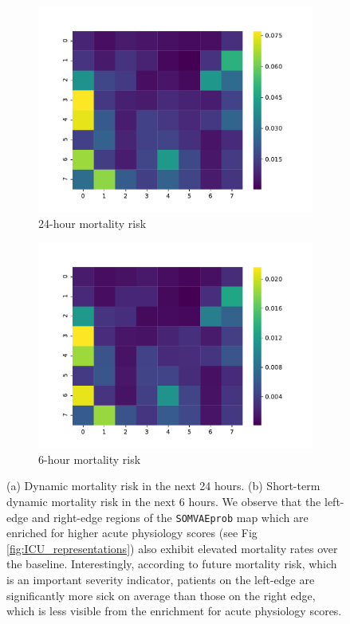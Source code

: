 \begin{figure}[h!]
\centering
\begin{subfigure}[t]{0.47\textwidth}
\centering
\includegraphics[scale=0.4]{./figures/icu_somvaeprob/detail_heatmaps_unit_discharge_expired_24}
\caption{24-hour mortality risk}
\end{subfigure}
\begin{subfigure}[t]{0.47\textwidth}
\centering
\includegraphics[scale=0.4]{./figures/icu_somvaeprob/detail_heatmaps_unit_discharge_expired_6}
\caption{6-hour mortality risk}
\end{subfigure}
\caption{(a) Dynamic mortality risk in the next 24 hours. (b) Short-term dynamic mortality risk in the next
             6 hours. We observe that the left-edge and right-edge regions of the \texttt{SOMVAEprob} map which
             are enriched for higher acute physiology scores (see Fig \ref{fig:ICU_representations}) also exhibit elevated 
             mortality rates over the baseline. Interestingly, according to future mortality risk, which is an important severity indicator,
             patients on the left-edge are significantly more sick on average than those on the right edge, which is
             less visible from the enrichment for acute physiology scores.}
\end{figure}


